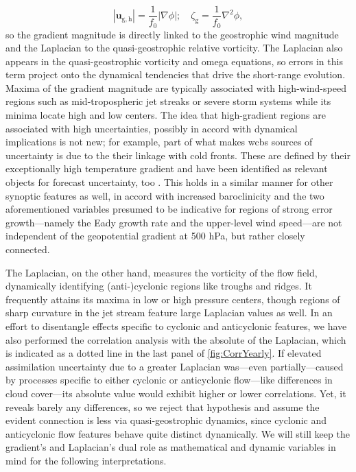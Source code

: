 \begin{equation} \label{eq:QGTheory}
    |\mathbf{u}_{\mathrm{g,h}}| = \frac{1}{f_0}|\nabla \phi|; \quad \zeta_{\mathrm{g}} = \frac{1}{f_0} \nabla^2 \phi,
\end{equation}
so the gradient magnitude is directly linked to the geostrophic wind magnitude and the Laplacian to the quasi-geostrophic relative vorticity. The Laplacian also appears in the quasi-geostrophic vorticity and omega equations, so errors in this term project onto the dynamical tendencies that drive the short-range evolution. Maxima of the gradient magnitude are typically associated with high-wind-speed regions such as mid-tropospheric jet streaks or severe storm systems while its minima locate high and low centers. The idea that high-gradient regions are associated with high uncertainties, possibly in accord with dynamical implications is not new; for example, part of what makes \glspl{wcb} sources of uncertainty is due to the their linkage with cold fronts. These are defined by their exceptionally high temperature gradient and have been identified as relevant objects for forecast uncertainty, too \parencite{wernliImportanceDiabaticProcesses2024}. This holds in a similar manner for other synoptic features as well, in accord with increased baroclinicity \parencite{yuForecastErrorsAttributed2025} and the two aforementioned variables presumed to be indicative for regions of strong error growth---namely the Eady growth rate and the upper-level wind speed---are not independent of the geopotential gradient at 500 hPa, but rather closely connected.

The Laplacian, on the other hand, measures the vorticity of the flow field, dynamically identifying (anti-)cyclonic regions like troughs and ridges. It frequently attains its maxima in low or high pressure centers, though regions of sharp curvature in the jet stream feature large Laplacian values as well. In an effort to disentangle effects specific to cyclonic and anticyclonic features, we have also performed the correlation analysis with the absolute of the Laplacian, which is indicated as a dotted line in the last panel of \cref{fig:CorrYearly}. If elevated assimilation uncertainty due to a greater Laplacian was---even partially---caused by processes specific to either cyclonic or anticyclonic flow---like differences in cloud cover---its absolute value would exhibit higher or lower correlations. Yet, it reveals barely any differences, so we reject that hypothesis and assume the evident connection is less via quasi-geostrophic dynamics, since cyclonic and anticyclonic flow features behave quite distinct dynamically. We will still keep the gradient's and Laplacian's dual role as mathematical and dynamic variables in mind for the following interpretations.

